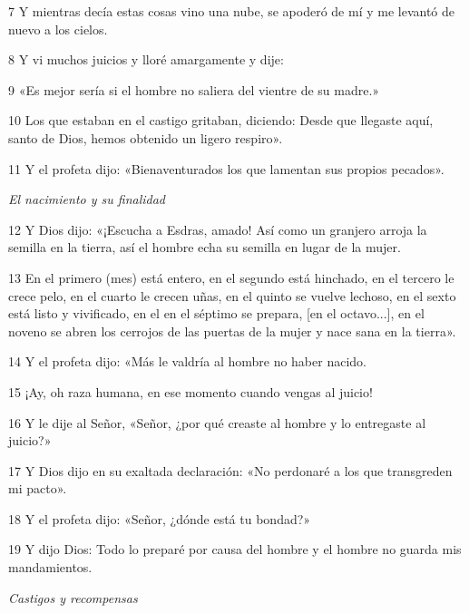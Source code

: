 \par 7 Y mientras decía estas cosas vino una nube, se apoderó de mí y me levantó de nuevo a los cielos.

\par 8 Y vi muchos juicios y lloré amargamente y dije: 

\par 9 «Es mejor sería si el hombre no saliera del vientre de su madre.»

\par 10 Los que estaban en el castigo gritaban, diciendo: Desde que llegaste aquí, santo de Dios, hemos obtenido un ligero respiro».

\par 11 Y el profeta dijo: «Bienaventurados los que lamentan sus propios pecados».

\par \textit{El nacimiento y su finalidad}

\par 12 Y Dios dijo: «¡Escucha a Esdras, amado! Así como un granjero arroja la semilla en la tierra, así el hombre echa su semilla en lugar de la mujer.

\par 13 En el primero (mes) está entero, en el segundo está hinchado, en el tercero le crece pelo, en el cuarto le crecen uñas, en el quinto se vuelve lechoso, en el sexto está listo y vivificado, en el en el séptimo se prepara, [en el octavo...], en el noveno se abren los cerrojos de las puertas de la mujer y nace sana en la tierra».

\par 14 Y el profeta dijo: «Más le valdría al hombre no haber nacido.

\par 15 ¡Ay, oh raza humana, en ese momento cuando vengas al juicio!

\par 16 Y le dije al Señor, «Señor, ¿por qué creaste al hombre y lo entregaste al juicio?»

\par 17 Y Dios dijo en su exaltada declaración: «No perdonaré a los que transgreden mi pacto».

\par 18 Y el profeta dijo: «Señor, ¿dónde está tu bondad?» 

\par 19 Y dijo Dios: Todo lo preparé por causa del hombre y el hombre no guarda mis mandamientos.

\par \textit{Castigos y recompensas}

